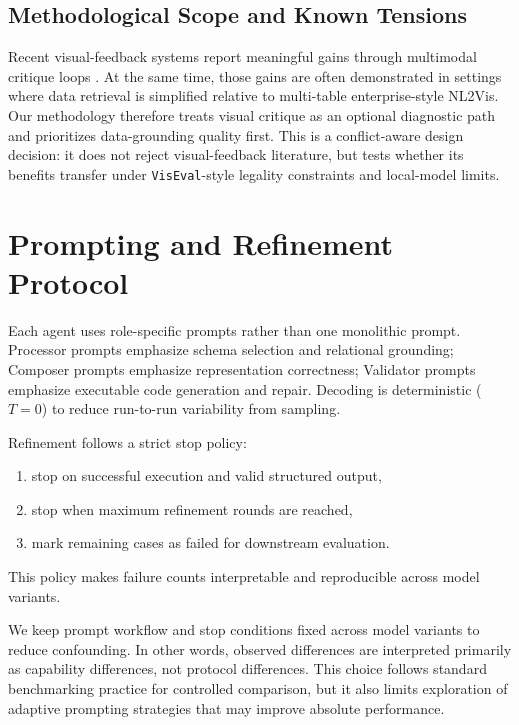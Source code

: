 \documentclass[a4paper,oneside,bibliography=totoc]{scrbook}
\begin{document}
\subsection{Methodological Scope and Known Tensions}

Recent visual-feedback systems report meaningful gains through multimodal critique loops \cite{yang2024matplotagent,shi2025visref}. At the same time, those gains are often demonstrated in settings where data retrieval is simplified relative to multi-table enterprise-style NL2Vis. Our methodology therefore treats visual critique as an optional diagnostic path and prioritizes data-grounding quality first. This is a conflict-aware design decision: it does not reject visual-feedback literature, but tests whether its benefits transfer under \texttt{VisEval}-style legality constraints and local-model limits.

\section{Prompting and Refinement Protocol}

Each agent uses role-specific prompts rather than one monolithic prompt. Processor prompts emphasize schema selection and relational grounding; Composer prompts emphasize representation correctness; Validator prompts emphasize executable code generation and repair. Decoding is deterministic ($T=0$) to reduce run-to-run variability from sampling.

Refinement follows a strict stop policy:
\begin{enumerate}
  \item stop on successful execution and valid structured output,
  \item stop when maximum refinement rounds are reached,
  \item mark remaining cases as failed for downstream evaluation.
\end{enumerate}

This policy makes failure counts interpretable and reproducible across model variants.

We keep prompt workflow and stop conditions fixed across model variants to reduce confounding. In other words, observed differences are interpreted primarily as capability differences, not protocol differences. This choice follows standard benchmarking practice for controlled comparison, but it also limits exploration of adaptive prompting strategies that may improve absolute performance.
\end{document}
